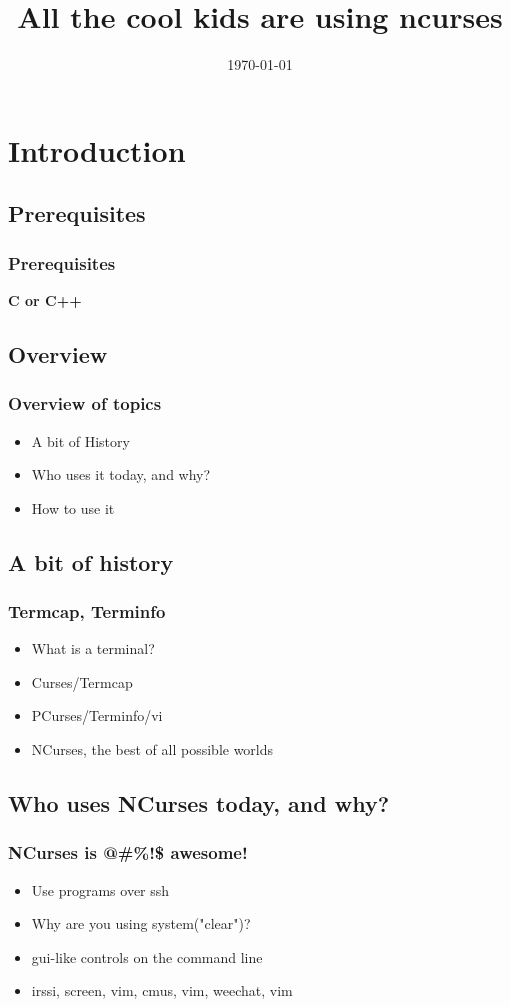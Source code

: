 \documentclass{beamer}
\title{All the cool kids are using ncurses}
\date{\today}
\begin{document}
\frame{\titlepage}

\section{Introduction}
\subsection{Prerequisites}
\frame 
{
    \frametitle{Prerequisites}
    \textbf{C or C++} 
}

\subsection{Overview}
\frame
{
    \frametitle{Overview of topics}

    \begin{itemize}
        \item A bit of History
        \item Who uses it today, and why?
        \item How to use it
    \end{itemize}
}

\subsection{A bit of history}
\frame
{
    \frametitle{Termcap, Terminfo}

    \begin{itemize}
        \item What is a terminal?
        \item Curses/Termcap
        \item PCurses/Terminfo/vi
        \item NCurses, the best of all possible worlds
    \end{itemize}
}

\subsection{Who uses NCurses today, and why?}
\frame
{
    \frametitle{NCurses is @\#\%!\$ awesome!}

    \begin{itemize}
        \item Use programs over ssh
        \item Why are you using system("clear")?
        \item gui-like controls on the command line
        \item irssi, screen, vim, cmus, vim, weechat, vim
    \end{itemize}
}
\end{document}
